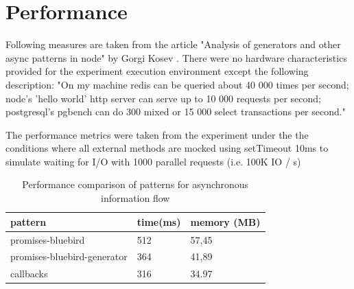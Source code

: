 





\section{Performance}
\label{subsec:performance}
Following measures are taken from the article "Analysis of generators and other async patterns in node" by Gorgi Kosev \cite{asyncPerformance_2} \cite{asyncPerformance}
. There were no hardware characteristics provided for the experiment execution environment except the following description\cite{asyncPerformance_2}: "On my machine redis can be queried about 40 000 times per second; node's 'hello world' http server can serve up to 10 000 requests per second; postgresql's pgbench can do 300 mixed or 15 000 select transactions per second." 

 The performance metrics were taken from the experiment under the the conditions where all external methods are mocked using setTimeout 10ms to simulate waiting for I/O with 1000 parallel requests (i.e. 100K IO / s) \cite{asyncPerformance_2}

\begin{table}[h]
	\begin{center}
		\begin{tabular}{| l | l | l | }
			\hline
			\textbf{pattern} & \textbf{time(ms)} & \textbf{memory (MB)} \\
			\hline
			promises-bluebird & 512 & 57,45 \\
			\hline
			promises-bluebird-generator & 364 & 41,89 \\
			\hline
			callbacks & 316 & 34.97 \\
			\hline
		\end{tabular}
	\end{center}
	\caption{Performance comparison of patterns for asynchronous information flow \cite{asyncPerformance_2}\cite{asyncPerformance}}
\end{table}


